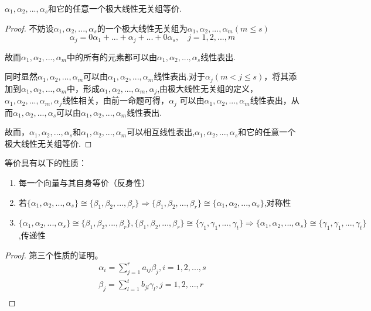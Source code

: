 \documentclass[blue,normal,cn]{elegantnote}
\begin{document}
\begin{theorem}
\begin{proposition}
    $α_1,α_2,...,α_s$和它的任意一个极大线性无关组等价.
\end{proposition}

\begin{proof}
    不妨设$α_1,α_2,...,α_s$的一个极大线性无关组为$α_1,α_2,...,α_m(m≤s)$
    \begin{equation*}
        α_j=0α_1+...+α_j+...+0α_s,\quad j=1,2,...,m
    \end{equation*}

    故而$α_1,α_2,...,α_m$中的所有的元素都可以由$α_1,α_2,...,α_s$线性表出.

    同时显然$α_1,α_2,...,α_m$可以由$α_1,α_2,...,α_m$线性表出.对于$α_j(m<j≤s)$，将其添加到$α_1,α_2,...,α_m$中，形成$α_1,α_2,...,α_m,α_j$,由极大线性无关组的定义，$α_1,α_2,...,α_m,α_j$线性相关，由前一命题可得，$α_j$
    可以由$α_1,α_2,...,α_m$线性表出，从而$α_1,α_2,...,α_s$可以由$α_1,α_2,...,α_m$线性表出.

    故而，$α_1,α_2,...,α_s$和$α_1,α_2,...,α_m$可以相互线性表出,$α_1,α_2,...,α_s$和它的任意一个极大线性无关组等价.
\end{proof}

\begin{property}
    等价具有以下的性质：
    \begin{enumerate}
            \item 每一个向量与其自身等价（反身性）
            \item 若$ \{α_1,α_2,...,α_s\} \cong \{β_1,β_2,...,β_r\} \Rightarrow \{β_1,β_2,...,β_r\} \cong \{α_1,α_2,...,α_s\}$,对称性
            \item  $\{α_1,α_2,...,α_s\} \cong \{β_1,β_2,...,β_r\},\{β_1,β_2,...,β_r\} \cong \{γ_1,γ_1,...,γ_t\} \Rightarrow  \{α_1,α_2,...,α_s\} \cong \{γ_1,γ_1,...,γ_t\}$,传递性
    \end{enumerate}
\end{property}
\begin{proof}
第三个性质的证明。
    \begin{equation*}
        \begin{aligned}
            α_i=\sum_{j=1}^{r}a_{ij}β_{j},i=1,2,...,s\\
            β_j=\sum_{l=1}^{t}b_{jl}γ_{l},j=1,2,...,r\\
        \end{aligned}
    \end{equation*}


\end{proof}
\end{theorem}
\end{document}

